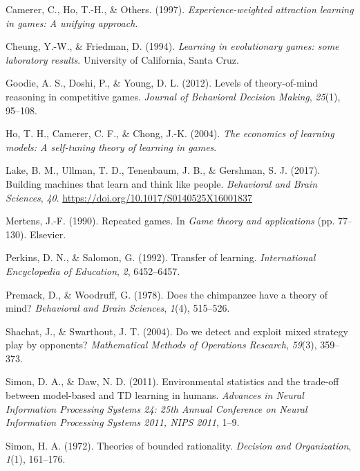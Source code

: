 \documentclass[man,floatsintext]{apa6}
\begin{document}
\leavevmode\hypertarget{ref-camerer1997experience}{}%
Camerer, C., Ho, T.-H., \& Others. (1997). \emph{Experience-weighted attraction learning in games: A unifying approach}.

\leavevmode\hypertarget{ref-cheung1994learning}{}%
Cheung, Y.-W., \& Friedman, D. (1994). \emph{Learning in evolutionary games: some laboratory results}. University of California, Santa Cruz.

\leavevmode\hypertarget{ref-goodie2012levels}{}%
Goodie, A. S., Doshi, P., \& Young, D. L. (2012). Levels of theory-of-mind reasoning in competitive games. \emph{Journal of Behavioral Decision Making}, \emph{25}(1), 95--108.

\leavevmode\hypertarget{ref-ho2004economics}{}%
Ho, T. H., Camerer, C. F., \& Chong, J.-K. (2004). \emph{The economics of learning models: A self-tuning theory of learning in games}.

\leavevmode\hypertarget{ref-Lake2017}{}%
Lake, B. M., Ullman, T. D., Tenenbaum, J. B., \& Gershman, S. J. (2017). Building machines that learn and think like people. \emph{Behavioral and Brain Sciences}, \emph{40}. \url{https://doi.org/10.1017/S0140525X16001837}

\leavevmode\hypertarget{ref-mertens1990repeated}{}%
Mertens, J.-F. (1990). Repeated games. In \emph{Game theory and applications} (pp. 77--130). Elsevier.

\leavevmode\hypertarget{ref-perkins1992transfer}{}%
Perkins, D. N., \& Salomon, G. (1992). Transfer of learning. \emph{International Encyclopedia of Education}, \emph{2}, 6452--6457.

\leavevmode\hypertarget{ref-premack1978does}{}%
Premack, D., \& Woodruff, G. (1978). Does the chimpanzee have a theory of mind? \emph{Behavioral and Brain Sciences}, \emph{1}(4), 515--526.

\leavevmode\hypertarget{ref-shachat2004we}{}%
Shachat, J., \& Swarthout, J. T. (2004). Do we detect and exploit mixed strategy play by opponents? \emph{Mathematical Methods of Operations Research}, \emph{59}(3), 359--373.

\leavevmode\hypertarget{ref-Simon_Daw_11}{}%
Simon, D. A., \& Daw, N. D. (2011). Environmental statistics and the trade-off between model-based and TD learning in humans. \emph{Advances in Neural Information Processing Systems 24: 25th Annual Conference on Neural Information Processing Systems 2011, NIPS 2011}, 1--9.

\leavevmode\hypertarget{ref-simon1972theories}{}%
Simon, H. A. (1972). Theories of bounded rationality. \emph{Decision and Organization}, \emph{1}(1), 161--176.
\end{document}
